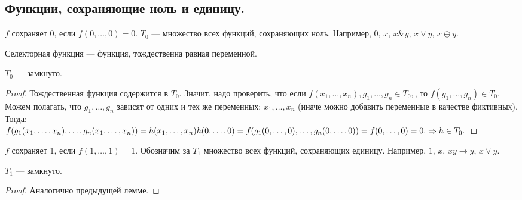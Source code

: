 \subsection{Функции, сохраняющие ноль и единицу.}
\begin{df}
	$f$ сохраняет 0, если $f(0,\ldots, 0)=0$.
	$T_0$ --- множество всех функций, сохраняющих ноль. Например, $0,\,x,\,x \& y,\, x \vee y,\, x \oplus y$.
\end{df}
\begin{df}
	Селекторная функция --- функция, тождественна равная переменной. 
\end{df}
\begin{lemma}
	$T_0 $ --- замкнуто. 
\end{lemma}
\begin{proof}
	Тождественная функция содержится в $T_0$. Значит, надо проверить, что если $f(x_1,\ldots, x_n),g_1, \ldots, g_n \in T_0, \text{, то~} f(g_1, \ldots, g_n) \in T_0.$ \\
	Можем полагать, что $g_1, \ldots, g_n$ зависят от одних и тех же переменных: $x_1, \ldots, x_n$ (иначе можно добавить переменные в качестве фиктивных). Тогда:\\
	$f(g_1(x_1, \ldots, x_n),\ldots, g_n(x_1, \ldots, x_n))=h(x_1, \ldots, x_n) \\
	h(0, \ldots, 0)=f(g_1(0,\ldots,0),\ldots,g_n(0, \ldots, 0))=f(0,\ldots,0)=0. \Rightarrow h \in T_0. 
$
\end{proof}
\begin{df}
	$f$ сохраняет 1, если $f(1,\ldots, 1)=1$.
	Обозначим за $T_1$ множество всех функций, сохраняющих единицу. Например, $1,\,x,\,xy\rightarrow y, \,x \vee y$.
\end{df}
\begin{lemma}
	$T_1 $ --- замкнуто. 
\end{lemma}
\begin{proof}
	Аналогично предыдущей лемме. 
\end{proof}
